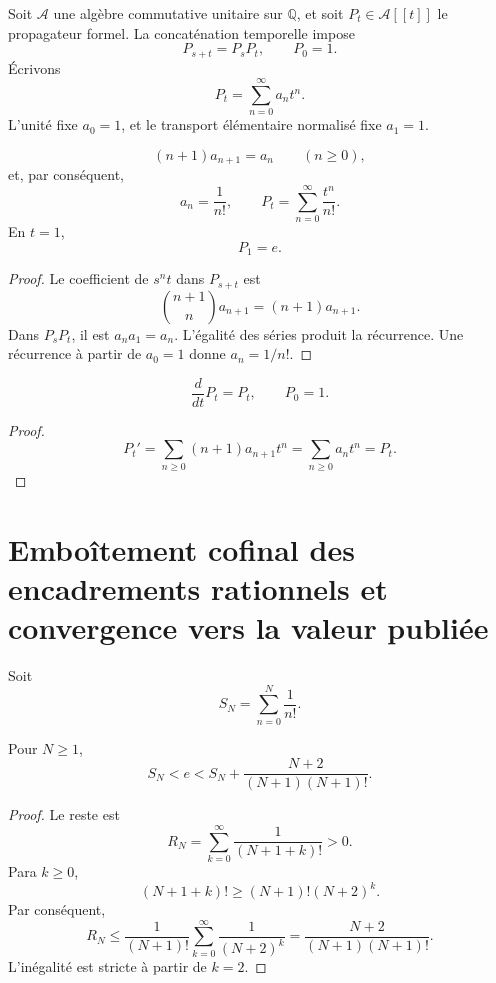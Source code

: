 Soit \(\mathcal A\) une algèbre commutative unitaire sur \(\mathbb Q\), et
soit \(P_t\in\mathcal A[[t]]\) le propagateur formel. La concaténation
temporelle impose
\[
 P_{s+t}=P_sP_t,
 \qquad
 P_0=1.
\]
Écrivons
\[
 P_t=\sum_{n=0}^{\infty}a_nt^n.
\]
L’unité fixe \(a_0=1\), et le transport élémentaire normalisé fixe
\(a_1=1\).

\begin{theorem}
\label{gfp:b:thm:recurrencia-factorial-e}
\[
 (n+1)a_{n+1}=a_n
 \qquad(n\geq0),
\]
et, par conséquent,
\[
 a_n=\frac1{n!},
 \qquad
 P_t=\sum_{n=0}^{\infty}\frac{t^n}{n!}.
\]
En \(t=1\),
\[
 \boxed{P_1=e.}
\]
\end{theorem}

\begin{proof}
Le coefficient de \(s^nt\) dans \(P_{s+t}\) est
\[
 \binom{n+1}{n}a_{n+1}=(n+1)a_{n+1}.
\]
Dans \(P_sP_t\), il est \(a_na_1=a_n\). L’égalité des séries produit la
récurrence. Une récurrence à partir de \(a_0=1\) donne \(a_n=1/n!\).
\end{proof}

\begin{corollary}
\[
 \frac{d}{dt}P_t=P_t,
 \qquad P_0=1.
\]
\end{corollary}

\begin{proof}
\[
 P_t'=\sum_{n\geq0}(n+1)a_{n+1}t^n
 =\sum_{n\geq0}a_nt^n=P_t.
\]
\end{proof}

\section{Emboîtement cofinal des encadrements rationnels et convergence vers la valeur publiée}

Soit
\[
 S_N=\sum_{n=0}^{N}\frac1{n!}.
\]

\begin{theorem}
\label{gfp:b:thm:cota-factorial-e}
Pour \(N\geq1\),
\begin{equation}
 \boxed{
 S_N<e<
 S_N+\frac{N+2}{(N+1)(N+1)!}.}
 \label{gfp:b:eq:horquilla-factorial-e}
\end{equation}
\end{theorem}

\begin{proof}
Le reste est
\[
 R_N=\sum_{k=0}^{\infty}\frac1{(N+1+k)!}>0.
\]
Para \(k\geq0\),
\[
 (N+1+k)!
 \geq(N+1)!(N+2)^k.
\]
Par conséquent,
\[
 R_N
 \leq\frac1{(N+1)!}
 \sum_{k=0}^{\infty}\frac1{(N+2)^k}
 =\frac{N+2}{(N+1)(N+1)!}.
\]
L’inégalité est stricte à partir de \(k=2\).
\end{proof}

